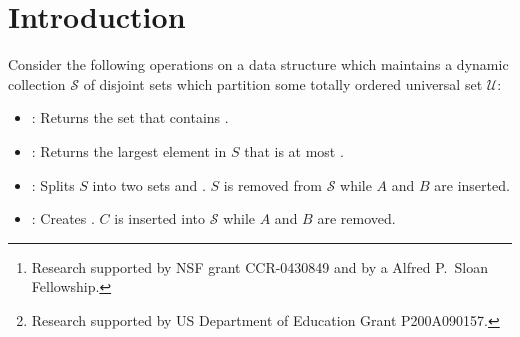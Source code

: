 \documentclass[11pt]{article}
\title{\probs}
\author{John Iacono\thanks{Research supported by NSF grant CCR-0430849 and by a Alfred P.~Sloan Fellowship.} 
\and
\"Ozg\"ur \"Ozkan\thanks{Research supported by US Department of Education Grant P200A090157.}
}
\date{Department of Computer Science and Engineering\\ Polytechnic Institute of NYU\\2 MetroTech Center\\Brooklyn, NY 11201-3840 USA}
\newcommand{\Ds}{Mergeable Dictionary}
\newcommand{\kwSpl}{Split}
\newcommand{\kwUnion}{Merge}
\newcommand{\universe}{\ensuremath{\mathcal U}}
\newcommand{\set}[1]{\ensuremath{#1}}
\newcommand{\collection}[1]{\ensuremath{\mathcal #1}}
\newcommand{\op}[1]{#1}
\begin{document}
\maketitle

\begin{abstract} 
A data structure is presented for the \Ds{} abstract data type, which supports the following operations on a collection of disjoint sets of totally ordered data: 
\op{Predecessor-Search}, \op{\kwSpl} and \op{\kwUnion}. While \op{Predecessor-Search} and \op{\kwSpl} work in the normal way, the novel operation is \op{\kwUnion}. While in a typical mergeable dictionary (e.g.~2-4 Trees), the \op{\kwUnion} operation can only be performed on sets that span disjoint intervals in keyspace, the structure here has no such limitation, and permits the merging of arbitrarily interleaved sets. 
Tarjan and Brown present a data structure~\cite{journals/jacm/BrownT79} which can handle arbitrary \op{\kwUnion} operations in  amortized time per operation if the set of operations is restricted to exclude the \op{\kwSpl} operation. In the presence of \op{\kwSpl} operations, the amortized time complexity of their structure becomes . A data structure which supports both \op{\kwSpl} and \op{\kwUnion} operations in  amortized time per operation was given by Farach and Thorup~\cite{journals/algorithmica/FarachT98}. 
In contrast, our data structure supports all operations, including \op{\kwSpl} and \op{\kwUnion}, in  amortized time, thus showing that interleaved \op{\kwUnion} operations can be supported at no additional cost vis-\`{a}-vis disjoint \op{\kwUnion} operations.
\end{abstract}







\section{Introduction} 

Consider the following operations on a data structure which maintains a dynamic collection \collection S of disjoint sets  which partition some totally ordered universal set \universe: 

\begin{itemize} 

\item : Returns the set  that contains . 

\item : Returns the largest element in \set S that is at most . 

\item : Splits \set S into two sets  and . \set S is removed from \collection S while \set A and \set B are inserted. 

\item : Creates . \set C is inserted into \collection S while \set A and \set B are removed. 

\end{itemize} 
\end{document}
